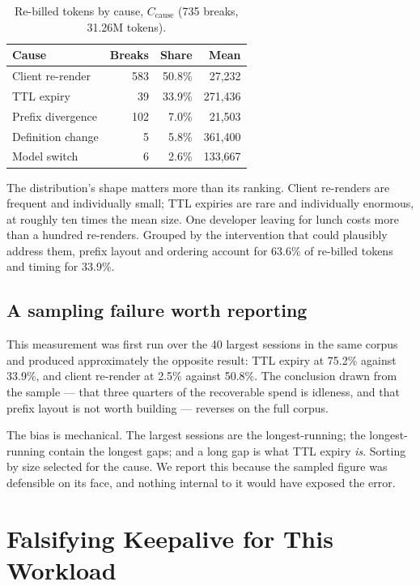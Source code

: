 \documentclass[11pt,twocolumn,letterpaper]{article}
\begin{document}
\begin{table}[h]
\centering
\caption{Re-billed tokens by cause, $C_{\text{cause}}$ (735 breaks,
31.26M tokens).}
\label{tab:breakdown}
\vskip 0.1in
\small
\begin{tabular}{lrrr}
\toprule
\textbf{Cause} & \textbf{Breaks} & \textbf{Share} & \textbf{Mean} \\
\midrule
Client re-render   & 583 & 50.8\% & 27{,}232 \\
TTL expiry         & 39  & 33.9\% & 271{,}436 \\
Prefix divergence  & 102 & 7.0\%  & 21{,}503 \\
Definition change  & 5   & 5.8\%  & 361{,}400 \\
Model switch       & 6   & 2.6\%  & 133{,}667 \\
\bottomrule
\end{tabular}
\end{table}

The distribution's shape matters more than its ranking. Client re-renders are
frequent and individually small; TTL expiries are rare and individually
enormous, at roughly ten times the mean size. One developer leaving for lunch
costs more than a hundred re-renders. Grouped by the intervention that could
plausibly address them, prefix layout and ordering account for 63.6\% of
re-billed tokens and timing for 33.9\%.

\subsection{A sampling failure worth reporting}

This measurement was first run over the 40 largest sessions in the same corpus
and produced approximately the opposite result: TTL expiry at 75.2\% against
33.9\%, and client re-render at 2.5\% against 50.8\%. The conclusion drawn from
the sample --- that three quarters of the recoverable spend is idleness, and
that prefix layout is not worth building --- reverses on the full corpus.

The bias is mechanical. The largest sessions are the longest-running; the
longest-running contain the longest gaps; and a long gap is what TTL expiry
\emph{is}. Sorting by size selected for the cause. We report this because the
sampled figure was defensible on its face, and nothing internal to it would
have exposed the error.

\section{Falsifying Keepalive for This Workload}
\end{document}
